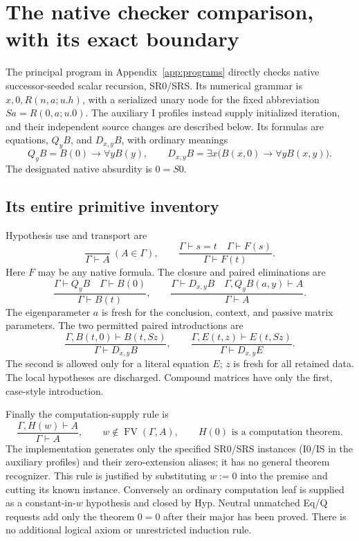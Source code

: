 \section{The native checker comparison, with its exact boundary}
\label{sec:checker}

The principal program in Appendix~\ref{app:programs} directly checks
native successor-seeded scalar recursion, SR0/SRS. Its numerical grammar
is $x,0,R(n,a;u.h)$, with a serialized unary node for the fixed abbreviation
$Sa=R(0,a;u.0)$. The auxiliary I profiles instead supply initialized
iteration, and their independent source changes are described below.
Its formulas are equations, $Q_yB$, and $D_{x,y}B$, with
ordinary meanings
\[
 Q_yB=B(0)\to\forall y B(y),\qquad
 D_{x,y}B=\exists x\bigl(B(x,0)\to\forall y B(x,y)\bigr).
\]
The designated native absurdity is $0=S0$.

\subsection{Its entire primitive inventory}

Hypothesis use and transport are
\[
 \frac{}{\Gamma\vdash A}\ (A\in\Gamma),\qquad
 \frac{\Gamma\vdash s=t\quad\Gamma\vdash F(s)}{\Gamma\vdash F(t)}.
\]
Here $F$ may be any native formula. The closure and paired eliminations are
\[
 \frac{\Gamma\vdash Q_yB\quad\Gamma\vdash B(0)}{\Gamma\vdash B(t)},\qquad
 \frac{\Gamma\vdash D_{x,y}B\quad\Gamma,Q_yB(a,y)\vdash A}{\Gamma\vdash A}.
\]
The eigenparameter $a$ is fresh for the conclusion, context, and passive
matrix parameters. The two permitted paired introductions are
\[
 \frac{\Gamma,B(t,0)\vdash B(t,Sz)}{\Gamma\vdash D_{x,y}B},\qquad
 \frac{\Gamma,E(t,z)\vdash E(t,Sz)}{\Gamma\vdash D_{x,y}E}.
\]
The second is allowed only for a literal equation $E$; $z$ is fresh for
all retained data. The local hypotheses are discharged. Compound matrices
have only the first, case-style introduction.

Finally the computation-supply rule is
\[
 \frac{\Gamma,H(w)\vdash A}{\Gamma\vdash A},\qquad
 w\notin\operatorname{FV}(\Gamma,A),\qquad H(0)\text{ is a computation theorem}.
\]
The implementation generates only the specified SR0/SRS instances (I0/IS in the auxiliary profiles) and their
zero-extension aliases; it has no general theorem recognizer. This rule
is justified by substituting $w:=0$ into the premise and cutting its
known instance. Conversely an ordinary computation leaf is supplied as
a constant-in-$w$ hypothesis and closed by Hyp. Neutral unmatched Eq/Q
requests add only the theorem $0=0$ after their major has been proved.
There is no additional logical axiom or unrestricted induction rule.

